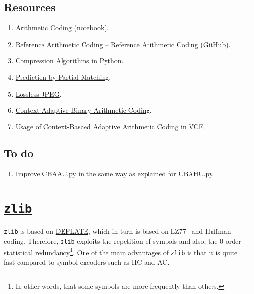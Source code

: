\subsection*{Resources}
\begin{enumerate}
\item
  \href{https://github.com/vicente-gonzalez-ruiz/arithmetic_coding/blob/master/src/arithmetic_coding.ipynb}{Arithmetic
    Coding (notebook)}.
\item
  \href{https://www.nayuki.io/page/reference-arithmetic-coding}{Reference
    Arithmetic Coding} --
  \href{https://github.com/nayuki/Reference-arithmetic-coding}{Reference
    Arithmetic Coding (GitHub)}.
\item \href{https://www.inference.org.uk/mackay/python/compress/#AC}{Compression Algorithms in Python}.
\item \href{https://en.wikipedia.org/wiki/Prediction_by_partial_matching}{Prediction by Partial Matching}.
\item \href{https://en.wikipedia.org/wiki/Lossless_JPEG}{Lossless JPEG}.
\item \href{https://en.wikipedia.org/wiki/Context-adaptive_binary_arithmetic_coding}{Context-Adaptive Binary Arithmetic Coding}.
\item Usage of \href{https://github.com/Sistemas-Multimedia/VCF/blob/main/notebooks/CBAHC.ipynb}{Context-Basaed Adaptive Arithmetic Coding in VCF}.
\end{enumerate}

\subsection*{To do}
\begin{enumerate}
\item Improve
  \href{https://github.com/Sistemas-Multimedia/VCF/blob/main/src/CBAAC.py}{CBAAC.py}
  in the same way as explained for
  \href{https://github.com/Sistemas-Multimedia/VCF/blob/main/src/CBAHC.py}{CBAHC.py}.
\end{enumerate}

\section{\href{https://zlib.net/}{\texttt{zlib}}}
\texttt{zlib} is based on
\href{https://en.wikipedia.org/wiki/Deflate}{DEFLATE}, which in turn
is based on LZ77~\cite{vruiz__LZW,ruiz2000compresion} and Huffman
coding. Therefore, \texttt{zlib} exploits the repetition of symbols
and also, the 0-order statistical redundancy\footnote{In other
  words, that some symbols are more frequently than others.}. One of
the main advantages of \texttt{zlib} is that it is quite fast compared to
symbol encoders such as HC and AC.

